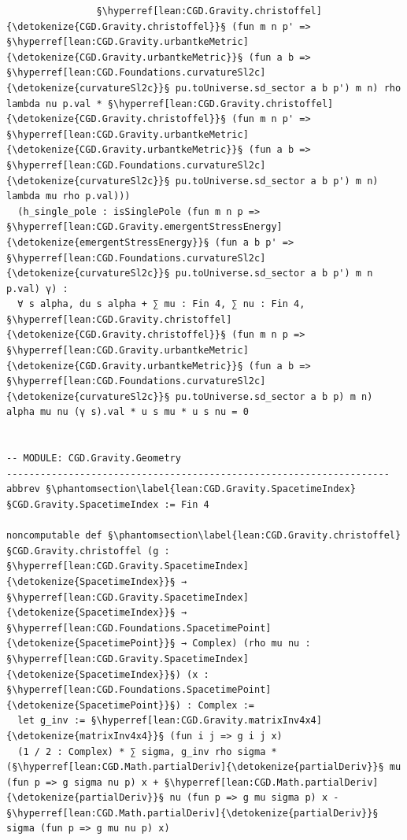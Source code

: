 \begin{verbatim}
                §\hyperref[lean:CGD.Gravity.christoffel]{\detokenize{CGD.Gravity.christoffel}}§ (fun m n p' => §\hyperref[lean:CGD.Gravity.urbantkeMetric]{\detokenize{CGD.Gravity.urbantkeMetric}}§ (fun a b => §\hyperref[lean:CGD.Foundations.curvatureSl2c]{\detokenize{curvatureSl2c}}§ pu.toUniverse.sd_sector a b p') m n) rho lambda nu p.val * §\hyperref[lean:CGD.Gravity.christoffel]{\detokenize{CGD.Gravity.christoffel}}§ (fun m n p' => §\hyperref[lean:CGD.Gravity.urbantkeMetric]{\detokenize{CGD.Gravity.urbantkeMetric}}§ (fun a b => §\hyperref[lean:CGD.Foundations.curvatureSl2c]{\detokenize{curvatureSl2c}}§ pu.toUniverse.sd_sector a b p') m n) lambda mu rho p.val)))
  (h_single_pole : isSinglePole (fun m n p => §\hyperref[lean:CGD.Gravity.emergentStressEnergy]{\detokenize{emergentStressEnergy}}§ (fun a b p' => §\hyperref[lean:CGD.Foundations.curvatureSl2c]{\detokenize{curvatureSl2c}}§ pu.toUniverse.sd_sector a b p') m n p.val) γ) :
  ∀ s alpha, du s alpha + ∑ mu : Fin 4, ∑ nu : Fin 4, §\hyperref[lean:CGD.Gravity.christoffel]{\detokenize{CGD.Gravity.christoffel}}§ (fun m n p => §\hyperref[lean:CGD.Gravity.urbantkeMetric]{\detokenize{CGD.Gravity.urbantkeMetric}}§ (fun a b => §\hyperref[lean:CGD.Foundations.curvatureSl2c]{\detokenize{curvatureSl2c}}§ pu.toUniverse.sd_sector a b p) m n) alpha mu nu (γ s).val * u s mu * u s nu = 0


-- MODULE: CGD.Gravity.Geometry
--------------------------------------------------------------------
abbrev §\phantomsection\label{lean:CGD.Gravity.SpacetimeIndex}§CGD.Gravity.SpacetimeIndex := Fin 4

noncomputable def §\phantomsection\label{lean:CGD.Gravity.christoffel}§CGD.Gravity.christoffel (g : §\hyperref[lean:CGD.Gravity.SpacetimeIndex]{\detokenize{SpacetimeIndex}}§ → §\hyperref[lean:CGD.Gravity.SpacetimeIndex]{\detokenize{SpacetimeIndex}}§ → §\hyperref[lean:CGD.Foundations.SpacetimePoint]{\detokenize{SpacetimePoint}}§ → Complex) (rho mu nu : §\hyperref[lean:CGD.Gravity.SpacetimeIndex]{\detokenize{SpacetimeIndex}}§) (x : §\hyperref[lean:CGD.Foundations.SpacetimePoint]{\detokenize{SpacetimePoint}}§) : Complex :=
  let g_inv := §\hyperref[lean:CGD.Gravity.matrixInv4x4]{\detokenize{matrixInv4x4}}§ (fun i j => g i j x)
  (1 / 2 : Complex) * ∑ sigma, g_inv rho sigma * (§\hyperref[lean:CGD.Math.partialDeriv]{\detokenize{partialDeriv}}§ mu (fun p => g sigma nu p) x + §\hyperref[lean:CGD.Math.partialDeriv]{\detokenize{partialDeriv}}§ nu (fun p => g mu sigma p) x - §\hyperref[lean:CGD.Math.partialDeriv]{\detokenize{partialDeriv}}§ sigma (fun p => g mu nu p) x)


\end{verbatim}
